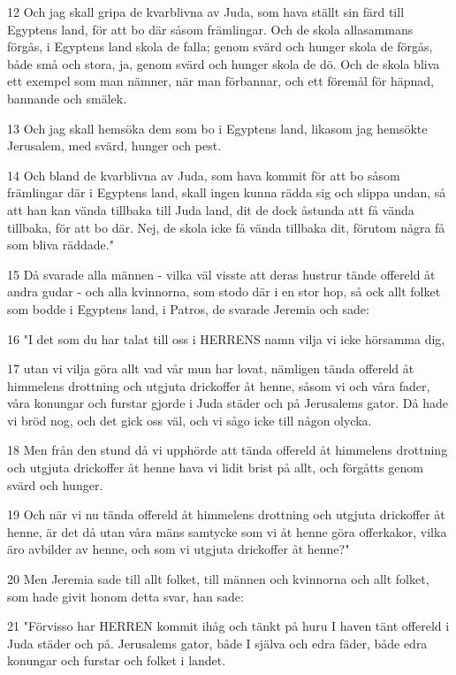 \par 12 Och jag skall gripa de kvarblivna av Juda, som hava ställt sin färd till Egyptens land, för att bo där såsom främlingar. Och de skola allasammans förgås, i Egyptens land skola de falla; genom svärd och hunger skola de förgås, både små och stora, ja, genom svärd och hunger skola de dö. Och de skola bliva ett exempel som man nämner, när man förbannar, och ett föremål för häpnad, bannande och smälek.
\par 13 Och jag skall hemsöka dem som bo i Egyptens land, likasom jag hemsökte Jerusalem, med svärd, hunger och pest.
\par 14 Och bland de kvarblivna av Juda, som hava kommit för att bo såsom främlingar där i Egyptens land, skall ingen kunna rädda sig och slippa undan, så att han kan vända tillbaka till Juda land, dit de dock åstunda att få vända tillbaka, för att bo där. Nej, de skola icke få vända tillbaka dit, förutom några få som bliva räddade."
\par 15 Då svarade alla männen - vilka väl visste att deras hustrur tände offereld åt andra gudar - och alla kvinnorna, som stodo där i en stor hop, så ock allt folket som bodde i Egyptens land, i Patros, de svarade Jeremia och sade:
\par 16 "I det som du har talat till oss i HERRENS namn vilja vi icke hörsamma dig,
\par 17 utan vi vilja göra allt vad vår mun har lovat, nämligen tända offereld åt himmelens drottning och utgjuta drickoffer åt henne, såsom vi och våra fader, våra konungar och furstar gjorde i Juda städer och på Jerusalems gator. Då hade vi bröd nog, och det gick oss väl, och vi sågo icke till någon olycka.
\par 18 Men från den stund då vi upphörde att tända offereld åt himmelens drottning och utgjuta drickoffer åt henne hava vi lidit brist på allt, och förgåtts genom svärd och hunger.
\par 19 Och när vi nu tända offereld åt himmelens drottning och utgjuta drickoffer åt henne, är det då utan våra mäns samtycke som vi åt henne göra offerkakor, vilka äro avbilder av henne, och som vi utgjuta drickoffer åt henne?"
\par 20 Men Jeremia sade till allt folket, till männen och kvinnorna och allt folket, som hade givit honom detta svar, han sade:
\par 21 "Förvisso har HERREN kommit ihåg och tänkt på huru I haven tänt offereld i Juda städer och på. Jerusalems gator, både I själva och edra fäder, både edra konungar och furstar och folket i landet.
